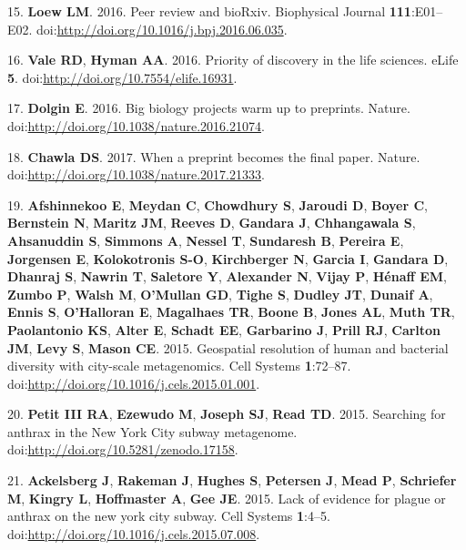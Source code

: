 \documentclass[11pt,]{article}
\begin{document}
15. \textbf{Loew LM}. 2016. Peer review and bioRxiv. Biophysical Journal
\textbf{111}:E01--E02.
doi:\url{http://doi.org/10.1016/j.bpj.2016.06.035}.

16. \textbf{Vale RD}, \textbf{Hyman AA}. 2016. Priority of discovery in
the life sciences. eLife \textbf{5}.
doi:\url{http://doi.org/10.7554/elife.16931}.

17. \textbf{Dolgin E}. 2016. Big biology projects warm up to preprints.
Nature. doi:\url{http://doi.org/10.1038/nature.2016.21074}.

18. \textbf{Chawla DS}. 2017. When a preprint becomes the final paper.
Nature. doi:\url{http://doi.org/10.1038/nature.2017.21333}.

19. \textbf{Afshinnekoo E}, \textbf{Meydan C}, \textbf{Chowdhury S},
\textbf{Jaroudi D}, \textbf{Boyer C}, \textbf{Bernstein N},
\textbf{Maritz JM}, \textbf{Reeves D}, \textbf{Gandara J},
\textbf{Chhangawala S}, \textbf{Ahsanuddin S}, \textbf{Simmons A},
\textbf{Nessel T}, \textbf{Sundaresh B}, \textbf{Pereira E},
\textbf{Jorgensen E}, \textbf{Kolokotronis S-O}, \textbf{Kirchberger N},
\textbf{Garcia I}, \textbf{Gandara D}, \textbf{Dhanraj S},
\textbf{Nawrin T}, \textbf{Saletore Y}, \textbf{Alexander N},
\textbf{Vijay P}, \textbf{Hénaff EM}, \textbf{Zumbo P}, \textbf{Walsh
M}, \textbf{O'Mullan GD}, \textbf{Tighe S}, \textbf{Dudley JT},
\textbf{Dunaif A}, \textbf{Ennis S}, \textbf{O'Halloran E},
\textbf{Magalhaes TR}, \textbf{Boone B}, \textbf{Jones AL}, \textbf{Muth
TR}, \textbf{Paolantonio KS}, \textbf{Alter E}, \textbf{Schadt EE},
\textbf{Garbarino J}, \textbf{Prill RJ}, \textbf{Carlton JM},
\textbf{Levy S}, \textbf{Mason CE}. 2015. Geospatial resolution of human
and bacterial diversity with city-scale metagenomics. Cell Systems
\textbf{1}:72--87. doi:\url{http://doi.org/10.1016/j.cels.2015.01.001}.

20. \textbf{Petit III RA}, \textbf{Ezewudo M}, \textbf{Joseph SJ},
\textbf{Read TD}. 2015. Searching for anthrax in the New York City
subway metagenome. doi:\url{http://doi.org/10.5281/zenodo.17158}.

21. \textbf{Ackelsberg J}, \textbf{Rakeman J}, \textbf{Hughes S},
\textbf{Petersen J}, \textbf{Mead P}, \textbf{Schriefer M},
\textbf{Kingry L}, \textbf{Hoffmaster A}, \textbf{Gee JE}. 2015. Lack of
evidence for plague or anthrax on the new york city subway. Cell Systems
\textbf{1}:4--5. doi:\url{http://doi.org/10.1016/j.cels.2015.07.008}.
\end{document}
